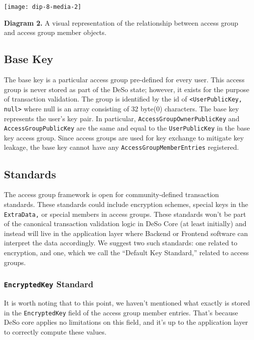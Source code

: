 \documentclass[oneside, 12pt]{article}
\begin{document}
\texttt{[image: dip-8-media-2]}
\begin{center}
    \begin{footnotesize}
    \textbf{Diagram 2.} A visual representation of the relationship between access group and access group member objects.
    \end{footnotesize}
\end{center}

\subsection{Base Key}
The base key is a particular access group pre-defined for every user. This access group is never stored as part of the DeSo state; however, it exists for the purpose of transaction validation. The group is identified by the id of \texttt{<UserPublicKey, null>} where null is an array consisting of 32 byte(0) characters. The base key represents the user’s key pair. In particular, \texttt{AccessGroupOwnerPublicKey} and \texttt{AccessGroupPublicKey} are the same and equal to the \texttt{UserPublicKey} in the base key access group. Since access groups are used for key exchange to mitigate key leakage, the base key cannot have any \texttt{AccessGroupMemberEntries} registered.

\subsection{Standards}
The access group framework is open for community-defined transaction standards. These standards could include encryption schemes, special keys in the \texttt{ExtraData,} or special members in access groups. These standards won’t be part of the canonical transaction validation logic in DeSo Core (at least initially) and instead will live in the application layer where Backend or Frontend software can interpret the data accordingly. We suggest two such standards: one related to encryption, and one, which we call the “Default Key Standard,” related to access groups.

\subsubsection{\texttt{EncryptedKey} Standard}
It is worth noting that to this point, we haven’t mentioned what exactly is stored in the \texttt{EncryptedKey} field of the access group member entries. That’s because DeSo core applies no limitations on this field, and it’s up to the application layer to correctly compute these values.
\end{document}
